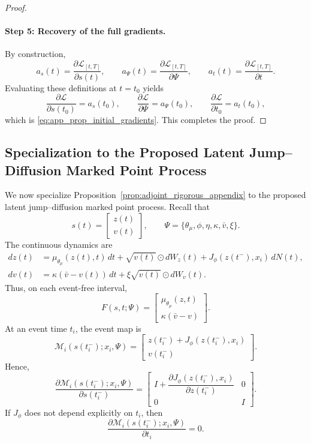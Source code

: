 \documentclass[11pt]{article}
\theoremstyle{definition}
\numberwithin{equation}{section}
\numberwithin{theorem}{section}
\numberwithin{proposition}{section}
\numberwithin{lemma}{section}
\numberwithin{corollary}{section}
\numberwithin{definition}{section}
\numberwithin{remark}{section}
\newcommand{\1}{\mathbbm{1}}
\begin{document}
\begin{proof}
\paragraph{Step 5: Recovery of the full gradients.}
By construction,
\[
a_s(t)=\frac{\partial \mathcal L_{[t,T]}}{\partial s(t)},
\qquad
a_\Psi(t)=\frac{\partial \mathcal L_{[t,T]}}{\partial \Psi},
\qquad
a_t(t)=\frac{\partial \mathcal L_{[t,T]}}{\partial t}.
\]
Evaluating these definitions at $t=t_0$ yields
\[
\frac{\partial \mathcal L}{\partial s(t_0)}=a_s(t_0),
\qquad
\frac{\partial \mathcal L}{\partial \Psi}=a_\Psi(t_0),
\qquad
\frac{\partial \mathcal L}{\partial t_0}=a_t(t_0),
\]
which is \eqref{eq:app_prop_initial_gradients}. This completes the proof.
\end{proof}

\subsection{Specialization to the Proposed Latent Jump--Diffusion Marked Point Process}

We now specialize Proposition~\ref{prop:adjoint_rigorous_appendix} to the proposed latent jump--diffusion marked point process. Recall that
\[
s(t)=
\begin{bmatrix}
z(t)\\
v(t)
\end{bmatrix},
\qquad
\Psi=\{\theta_\mu,\phi,\eta,\kappa,\bar v,\xi\}.
\]
The continuous dynamics are
\begin{equation}
\label{eq:app_specific_forward}
\begin{aligned}
dz(t)
&=
\mu_{\theta_\mu}(z(t),t)\,dt
+
\sqrt{v(t)}\odot dW_z(t)
+
J_\phi(z(t^-),x_i)\,dN(t),\\
dv(t)
&=
\kappa(\bar v-v(t))\,dt
+
\xi \sqrt{v(t)}\odot dW_v(t).
\end{aligned}
\end{equation}
Thus, on each event-free interval,
\[
F(s,t;\Psi)
=
\begin{bmatrix}
\mu_{\theta_\mu}(z,t)\\
\kappa(\bar v-v)
\end{bmatrix}.
\]
At an event time $t_i$, the event map is
\begin{equation}
\label{eq:app_specific_event_map}
\mathcal M_i(s(t_i^-);x_i,\Psi)
=
\begin{bmatrix}
z(t_i^-)+J_\phi(z(t_i^-),x_i)\\
v(t_i^-)
\end{bmatrix}.
\end{equation}
Hence,
\begin{equation}
\label{eq:app_specific_event_jacobian}
\frac{\partial \mathcal M_i(s(t_i^-);x_i,\Psi)}{\partial s(t_i^-)}
=
\begin{bmatrix}
I+\dfrac{\partial J_\phi(z(t_i^-),x_i)}{\partial z(t_i^-)} & 0\\[1.2ex]
0 & I
\end{bmatrix}.
\end{equation}
If $J_\phi$ does not depend explicitly on $t_i$, then
\[
\frac{\partial \mathcal M_i(s(t_i^-);x_i,\Psi)}{\partial t_i}=0.
\]
\end{document}
